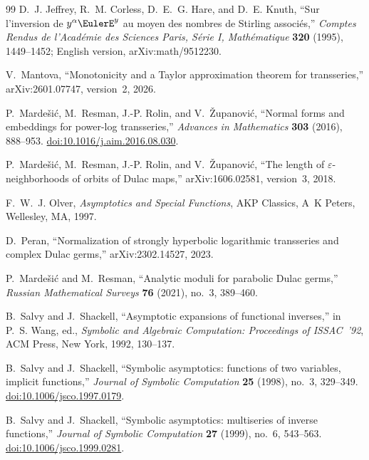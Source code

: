 \documentclass[11pt,oneside]{article}
\theoremstyle{plain}
\theoremstyle{definition}
\theoremstyle{remark}
\begin{document}
\begin{thebibliography}{99}
D.~J. Jeffrey, R.~M. Corless, D.~E.~G. Hare, and D.~E. Knuth,
``Sur l'inversion de \(y^{\alpha}\EulerE^{y}\) au moyen des nombres de
Stirling associ\'es,''
\emph{Comptes Rendus de l'Acad\'emie des Sciences Paris, S\'erie I,
Math\'ematique} \textbf{320} (1995), 1449--1452;
English version, arXiv:math/9512230.

V.~Mantova,
``Monotonicity and a Taylor approximation theorem for transseries,''
arXiv:2601.07747, version~2, 2026.

P.~Marde\v{s}i\'c, M.~Resman, J.-P. Rolin, and V.~\v{Z}upanovi\'c,
``Normal forms and embeddings for power-log transseries,''
\emph{Advances in Mathematics} \textbf{303} (2016), 888--953.
\href{https://doi.org/10.1016/j.aim.2016.08.030}{doi:10.1016/j.aim.2016.08.030}.

P.~Marde\v{s}i\'c, M.~Resman, J.-P. Rolin, and V.~\v{Z}upanovi\'c,
``The length of \(\varepsilon\)-neighborhoods of orbits of Dulac maps,''
arXiv:1606.02581, version~3, 2018.

F.~W.~J. Olver,
\emph{Asymptotics and Special Functions},
AKP Classics, A~K Peters, Wellesley, MA, 1997.

D.~Peran,
``Normalization of strongly hyperbolic logarithmic transseries and complex
Dulac germs,''
arXiv:2302.14527, 2023.

P.~Marde\v{s}i\'c and M.~Resman,
``Analytic moduli for parabolic Dulac germs,''
\emph{Russian Mathematical Surveys} \textbf{76} (2021), no.~3, 389--460.

B.~Salvy and J.~Shackell,
``Asymptotic expansions of functional inverses,''
in P.~S. Wang, ed., \emph{Symbolic and Algebraic Computation: Proceedings of
ISSAC~'92}, ACM Press, New York, 1992, 130--137.

B.~Salvy and J.~Shackell,
``Symbolic asymptotics: functions of two variables, implicit functions,''
\emph{Journal of Symbolic Computation} \textbf{25} (1998), no.~3, 329--349.
\href{https://doi.org/10.1006/jsco.1997.0179}{doi:10.1006/jsco.1997.0179}.

B.~Salvy and J.~Shackell,
``Symbolic asymptotics: multiseries of inverse functions,''
\emph{Journal of Symbolic Computation} \textbf{27} (1999), no.~6, 543--563.
\href{https://doi.org/10.1006/jsco.1999.0281}{doi:10.1006/jsco.1999.0281}.


\end{thebibliography}
\end{document}
